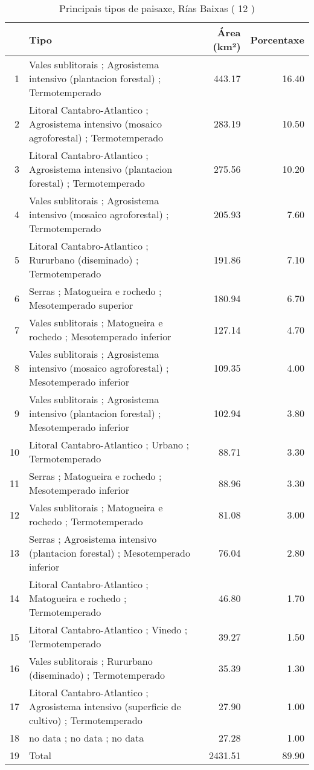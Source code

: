 \begin{table}[p]
\centering
\caption{Principais tipos de paisaxe,  Rías Baixas ( 12 )} 
\label{Tipos 12}
\begin{tabular}{rlrr}
  \hline
 & Tipo & Área (km²) & Porcentaxe \\ 
  \hline
1 & Vales sublitorais ; Agrosistema intensivo (plantacion forestal) ; Termotemperado & 443.17 & 16.40 \\ 
  2 & Litoral Cantabro-Atlantico ; Agrosistema intensivo (mosaico agroforestal) ; Termotemperado & 283.19 & 10.50 \\ 
  3 & Litoral Cantabro-Atlantico ; Agrosistema intensivo (plantacion forestal) ; Termotemperado & 275.56 & 10.20 \\ 
  4 & Vales sublitorais ; Agrosistema intensivo (mosaico agroforestal) ; Termotemperado & 205.93 & 7.60 \\ 
  5 & Litoral Cantabro-Atlantico ; Rururbano (diseminado) ; Termotemperado & 191.86 & 7.10 \\ 
  6 & Serras ; Matogueira e rochedo ; Mesotemperado superior & 180.94 & 6.70 \\ 
  7 & Vales sublitorais ; Matogueira e rochedo ; Mesotemperado inferior & 127.14 & 4.70 \\ 
  8 & Vales sublitorais ; Agrosistema intensivo (mosaico agroforestal) ; Mesotemperado inferior & 109.35 & 4.00 \\ 
  9 & Vales sublitorais ; Agrosistema intensivo (plantacion forestal) ; Mesotemperado inferior & 102.94 & 3.80 \\ 
  10 & Litoral Cantabro-Atlantico ; Urbano ; Termotemperado & 88.71 & 3.30 \\ 
  11 & Serras ; Matogueira e rochedo ; Mesotemperado inferior & 88.96 & 3.30 \\ 
  12 & Vales sublitorais ; Matogueira e rochedo ; Termotemperado & 81.08 & 3.00 \\ 
  13 & Serras ; Agrosistema intensivo (plantacion forestal) ; Mesotemperado inferior & 76.04 & 2.80 \\ 
  14 & Litoral Cantabro-Atlantico ; Matogueira e rochedo ; Termotemperado & 46.80 & 1.70 \\ 
  15 & Litoral Cantabro-Atlantico ; Vinedo ; Termotemperado & 39.27 & 1.50 \\ 
  16 & Vales sublitorais ; Rururbano (diseminado) ; Termotemperado & 35.39 & 1.30 \\ 
  17 & Litoral Cantabro-Atlantico ; Agrosistema intensivo (superficie de cultivo) ; Termotemperado & 27.90 & 1.00 \\ 
  18 & no data ; no data ; no data & 27.28 & 1.00 \\ 
  19 & Total & 2431.51 & 89.90 \\ 
   \hline
\end{tabular}
\end{table}
